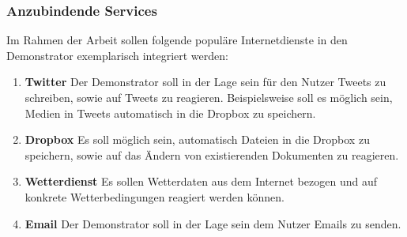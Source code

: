 \subsubsection{Anzubindende Services}
\label{subsec:anzubindende_services}
Im Rahmen der Arbeit sollen folgende populäre Internetdienste in den Demonstrator exemplarisch integriert werden:
\begin{enumerate}
\item \textbf{Twitter} Der Demonstrator soll in der Lage sein für den Nutzer Tweets zu schreiben, sowie auf Tweets zu reagieren. Beispielsweise soll es möglich sein, Medien in Tweets automatisch in die Dropbox zu speichern.
\item \textbf{Dropbox} Es soll möglich sein, automatisch Dateien in die Dropbox zu speichern, sowie auf das Ändern von existierenden Dokumenten zu reagieren.
\item \textbf{Wetterdienst} Es sollen Wetterdaten aus dem Internet bezogen und auf konkrete Wetterbedingungen reagiert werden können.
\item \textbf{Email} Der Demonstrator soll in der Lage sein dem Nutzer Emails zu senden.
\end{enumerate}



